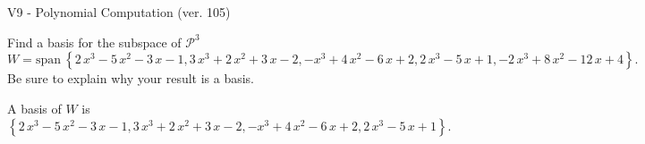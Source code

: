 \begin{exercise}
  \begin{exerciseTitle}V9 - Polynomial Computation (ver. 105)\end{exerciseTitle}
  \begin{exerciseStatement}
    Find a basis for the subspace of \(\mathcal{P}^3\) 
\[W=\mathrm{span}\ \left\{2 \, x^{3} - 5 \, x^{2} - 3 \, x - 1 , 3 \, x^{3} + 2 \, x^{2} + 3 \, x - 2 , -x^{3} + 4 \, x^{2} - 6 \, x + 2 , 2 \, x^{3} - 5 \, x + 1 , -2 \, x^{3} + 8 \, x^{2} - 12 \, x + 4\right\}.\]
 Be sure to explain why your result is a basis.


  \end{exerciseStatement}
  \begin{exerciseAnswer}
   A basis of \(W\) is  \(\left\{2 \, x^{3} - 5 \, x^{2} - 3 \, x - 1 , 3 \, x^{3} + 2 \, x^{2} + 3 \, x - 2 , -x^{3} + 4 \, x^{2} - 6 \, x + 2 , 2 \, x^{3} - 5 \, x + 1\right\}\).
  


  \end{exerciseAnswer}
\end{exercise}